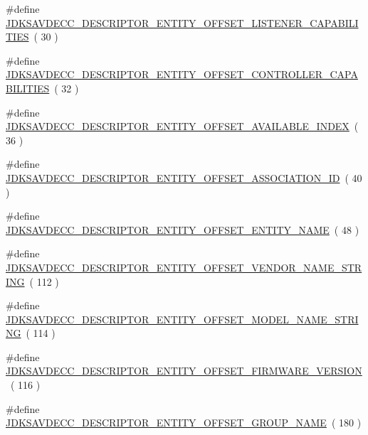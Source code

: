 \begin{DoxyCompactItemize}
\item 
\#define \hyperlink{group__descriptor__entity_gaf6dff72c60f20e29c990cf031754371e}{J\+D\+K\+S\+A\+V\+D\+E\+C\+C\+\_\+\+D\+E\+S\+C\+R\+I\+P\+T\+O\+R\+\_\+\+E\+N\+T\+I\+T\+Y\+\_\+\+O\+F\+F\+S\+E\+T\+\_\+\+L\+I\+S\+T\+E\+N\+E\+R\+\_\+\+C\+A\+P\+A\+B\+I\+L\+I\+T\+I\+ES}~( 30 )
\item 
\#define \hyperlink{group__descriptor__entity_ga3bcdf49f39a5a219f1f0ae016cf56a27}{J\+D\+K\+S\+A\+V\+D\+E\+C\+C\+\_\+\+D\+E\+S\+C\+R\+I\+P\+T\+O\+R\+\_\+\+E\+N\+T\+I\+T\+Y\+\_\+\+O\+F\+F\+S\+E\+T\+\_\+\+C\+O\+N\+T\+R\+O\+L\+L\+E\+R\+\_\+\+C\+A\+P\+A\+B\+I\+L\+I\+T\+I\+ES}~( 32 )
\item 
\#define \hyperlink{group__descriptor__entity_ga2569ce3faf28d9fee7c79556e8bd8e99}{J\+D\+K\+S\+A\+V\+D\+E\+C\+C\+\_\+\+D\+E\+S\+C\+R\+I\+P\+T\+O\+R\+\_\+\+E\+N\+T\+I\+T\+Y\+\_\+\+O\+F\+F\+S\+E\+T\+\_\+\+A\+V\+A\+I\+L\+A\+B\+L\+E\+\_\+\+I\+N\+D\+EX}~( 36 )
\item 
\#define \hyperlink{group__descriptor__entity_ga36a0b82607f988e0f1299c3da9033747}{J\+D\+K\+S\+A\+V\+D\+E\+C\+C\+\_\+\+D\+E\+S\+C\+R\+I\+P\+T\+O\+R\+\_\+\+E\+N\+T\+I\+T\+Y\+\_\+\+O\+F\+F\+S\+E\+T\+\_\+\+A\+S\+S\+O\+C\+I\+A\+T\+I\+O\+N\+\_\+\+ID}~( 40 )
\item 
\#define \hyperlink{group__descriptor__entity_ga8516e8d1fa7a2ab7819869c10d3de346}{J\+D\+K\+S\+A\+V\+D\+E\+C\+C\+\_\+\+D\+E\+S\+C\+R\+I\+P\+T\+O\+R\+\_\+\+E\+N\+T\+I\+T\+Y\+\_\+\+O\+F\+F\+S\+E\+T\+\_\+\+E\+N\+T\+I\+T\+Y\+\_\+\+N\+A\+ME}~( 48 )
\item 
\#define \hyperlink{group__descriptor__entity_ga2c69bc2c12392a988ba6ce130d778680}{J\+D\+K\+S\+A\+V\+D\+E\+C\+C\+\_\+\+D\+E\+S\+C\+R\+I\+P\+T\+O\+R\+\_\+\+E\+N\+T\+I\+T\+Y\+\_\+\+O\+F\+F\+S\+E\+T\+\_\+\+V\+E\+N\+D\+O\+R\+\_\+\+N\+A\+M\+E\+\_\+\+S\+T\+R\+I\+NG}~( 112 )
\item 
\#define \hyperlink{group__descriptor__entity_ga6471252178001ddf040b92dfc097690b}{J\+D\+K\+S\+A\+V\+D\+E\+C\+C\+\_\+\+D\+E\+S\+C\+R\+I\+P\+T\+O\+R\+\_\+\+E\+N\+T\+I\+T\+Y\+\_\+\+O\+F\+F\+S\+E\+T\+\_\+\+M\+O\+D\+E\+L\+\_\+\+N\+A\+M\+E\+\_\+\+S\+T\+R\+I\+NG}~( 114 )
\item 
\#define \hyperlink{group__descriptor__entity_ga952791a00d09973e53f28f462fc40c57}{J\+D\+K\+S\+A\+V\+D\+E\+C\+C\+\_\+\+D\+E\+S\+C\+R\+I\+P\+T\+O\+R\+\_\+\+E\+N\+T\+I\+T\+Y\+\_\+\+O\+F\+F\+S\+E\+T\+\_\+\+F\+I\+R\+M\+W\+A\+R\+E\+\_\+\+V\+E\+R\+S\+I\+ON}~( 116 )
\item 
\#define \hyperlink{group__descriptor__entity_gabd35e647e32849ff6288790c300ae4e7}{J\+D\+K\+S\+A\+V\+D\+E\+C\+C\+\_\+\+D\+E\+S\+C\+R\+I\+P\+T\+O\+R\+\_\+\+E\+N\+T\+I\+T\+Y\+\_\+\+O\+F\+F\+S\+E\+T\+\_\+\+G\+R\+O\+U\+P\+\_\+\+N\+A\+ME}~( 180 )

\end{DoxyCompactItemize}
